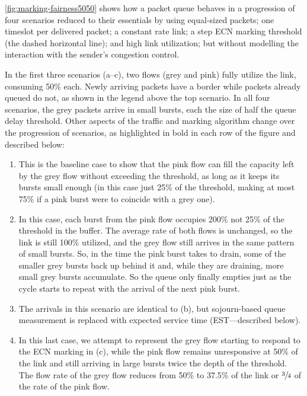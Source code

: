\autoref{fig:marking-fairness5050} shows how a packet queue behaves in a progression of four scenarios reduced to their essentials by using equal-sized packets; one timeslot per delivered packet; a constant rate link; a step ECN marking threshold (the dashed horizontal line); and high link utilization; but without modelling the interaction with the sender's congestion control. 

In the first three scenarios (a--c), two flows (grey and pink) fully utilize the link, consuming 50\% each. Newly arriving packets have a border while packets already queued do not, as shown in the legend above the top scenario. In all four scenarios, the grey packets arrive in small bursts, each the size of half the queue delay threshold. Other aspects of the traffic and marking algorithm change over the progression of scenarios, as highlighted in bold in each row of the figure and described below:
\begin{enumerate}[nosep, label=\alph*)]
	\item This is the baseline case to show that the pink flow can fill the capacity left by the grey flow without exceeding the threshold, as long as it keeps its bursts small enough (in this case just 25\% of the threshold, making at most 75\% if a pink burst were to coincide with a grey one). 
	\item In this case, each burst from the pink flow occupies 200\% not 25\% of the threshold in the buffer. The average rate of both flows is unchanged, so the link is still 100\% utilized, and the grey flow still arrives in the same pattern of small bursts. So, in the time the pink burst takes to drain, some of the smaller grey bursts back up behind it and, while they are draining, more small grey bursts accumulate. So the queue only finally empties just as the cycle starts to repeat with the arrival of the next pink burst.
	\item The arrivals in this scenario are identical to (b), but sojourn-based queue measurement is replaced with expected service time (EST---described below).
	\item In this last case, we attempt to represent the grey flow starting to respond to the ECN marking in (c), while the pink flow remains unresponsive at 50\% of the link and still arriving in large bursts twice the depth of the threshold. The flow rate of the grey flow reduces from 50\% to 37.5\% of the link or \(\sfrac{3}{4}\) of the rate of the pink flow.
\end{enumerate}

